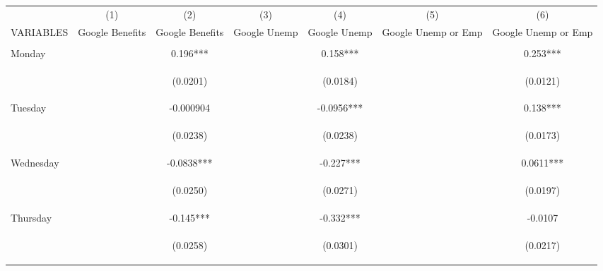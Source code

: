 \begin{center}
\begin{tabular}{lcccccc} \hline
 & (1) & (2) & (3) & (4) & (5) & (6) \\
VARIABLES & Google Benefits & Google Benefits & Google Unemp & Google Unemp & Google Unemp or Emp & Google Unemp or Emp \\ \hline
\vspace{4pt} &  &  &  &  &  &  \\
Monday &  & 0.196*** &  & 0.158*** &  & 0.253*** \\
\vspace{4pt} &  & \begin{footnotesize}(0.0201)\end{footnotesize} &  & \begin{footnotesize}(0.0184)\end{footnotesize} &  & \begin{footnotesize}(0.0121)\end{footnotesize} \\
Tuesday &  & -0.000904 &  & -0.0956*** &  & 0.138*** \\
\vspace{4pt} &  & \begin{footnotesize}(0.0238)\end{footnotesize} &  & \begin{footnotesize}(0.0238)\end{footnotesize} &  & \begin{footnotesize}(0.0173)\end{footnotesize} \\
Wednesday &  & -0.0838*** &  & -0.227*** &  & 0.0611*** \\
\vspace{4pt} &  & \begin{footnotesize}(0.0250)\end{footnotesize} &  & \begin{footnotesize}(0.0271)\end{footnotesize} &  & \begin{footnotesize}(0.0197)\end{footnotesize} \\
Thursday &  & -0.145*** &  & -0.332*** &  & -0.0107 \\
\vspace{4pt} &  & \begin{footnotesize}(0.0258)\end{footnotesize} &  & \begin{footnotesize}(0.0301)\end{footnotesize} &  & \begin{footnotesize}(0.0217)\end{footnotesize} \\

\end{tabular}
\end{center}
